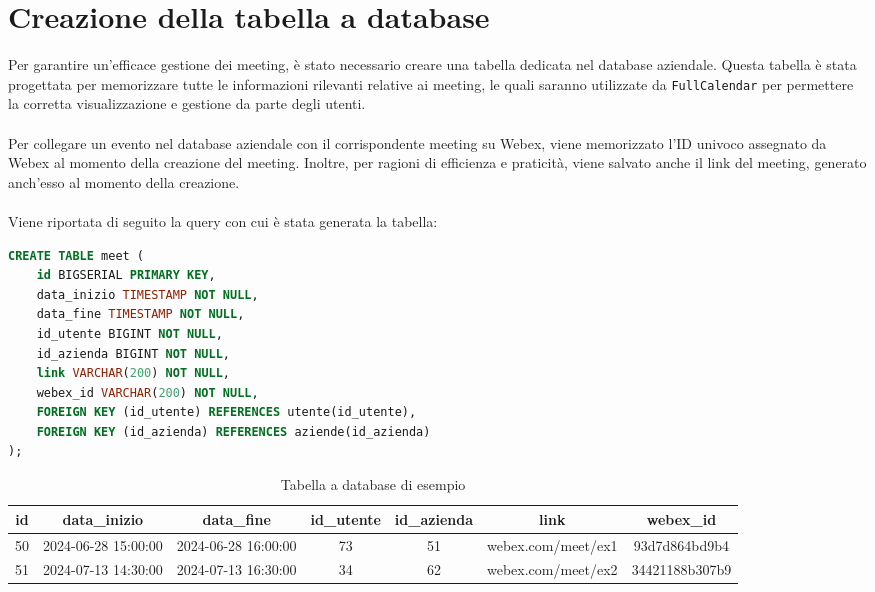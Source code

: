 \section{Creazione della tabella a database}
Per garantire un'efficace gestione dei meeting, è stato necessario creare una tabella dedicata nel database aziendale.
Questa tabella è stata progettata per memorizzare tutte le informazioni rilevanti relative ai meeting, le quali
saranno utilizzate da \texttt{FullCalendar} \cite{FullCalendarSite} per permettere la corretta visualizzazione e gestione 
da parte degli utenti.
\\
\\
Per collegare un evento nel database aziendale con il corrispondente meeting su Webex, viene memorizzato l'ID 
univoco assegnato da Webex al momento della creazione del meeting. Inoltre, per ragioni di efficienza e praticità, 
viene salvato anche il link del meeting, generato anch'esso al momento della creazione.
\\
\\
Viene riportata di seguito la query con cui è stata generata la tabella:
\begin{lstlisting}[language=SQL, frame=lines]
CREATE TABLE meet (
    id BIGSERIAL PRIMARY KEY,
    data_inizio TIMESTAMP NOT NULL,
    data_fine TIMESTAMP NOT NULL,
    id_utente BIGINT NOT NULL,
    id_azienda BIGINT NOT NULL,
    link VARCHAR(200) NOT NULL,
    webex_id VARCHAR(200) NOT NULL,
    FOREIGN KEY (id_utente) REFERENCES utente(id_utente),
    FOREIGN KEY (id_azienda) REFERENCES aziende(id_azienda)
);
\end{lstlisting}
\vspace{20pt}
\begin{table}[ht]
    \centering
    \begin{adjustbox}{width=13cm, center}
    \begin{tabular}{|c|c|c|c|c|c|c|}
        \hline
        \rowcolor{gray!30}
        id & data\_inizio & data\_fine & id\_utente & id\_azienda & link & webex\_id \\
        \hline
        50 & 2024-06-28 15:00:00 & 2024-06-28 16:00:00 & 73 & 51 & webex.com\//meet\//ex1 & 93d7d864bd9b4 \\
        \hline
        51 & 2024-07-13 14:30:00 & 2024-07-13 16:30:00 & 34 & 62 & webex.com\//meet\//ex2 & 34421188b307b9\\
        \hline
    \end{tabular}
    \end{adjustbox}
    \caption{Tabella a database di esempio}
\end{table}
